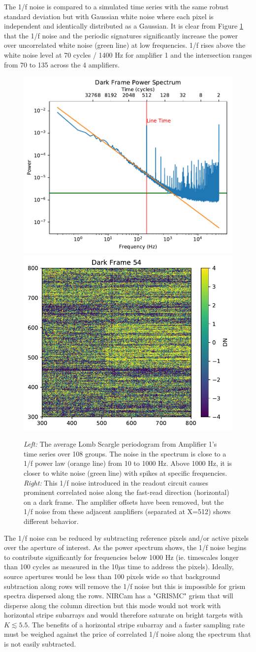 \documentclass{aastex62}
\begin{document}
The 1/f noise is compared to a simulated time series with the same robust standard deviation but with Gaussian white noise where each pixel is independent and identically distributed as a Gaussian.
It is clear from Figure \ref{fig:pixelTSeriesPSpec} that the 1/f noise and the periodic signatures significantly increase the power over uncorrelated white noise (green line) at low frequencies.
1/f rises above the white noise level at 70 cycles / 1400 Hz for amplifier 1 and the intersection ranges from 70 to 135 across the 4 amplifiers.

\begin{figure}[!hbtp]
\centering
\includegraphics[width=.4\columnwidth]{avg_psd_amp_1.pdf}
\includegraphics[width=.4\columnwidth]{preamp_removed_grp_54.pdf}
\caption{{\it Left:} The average Lomb Scargle periodogram from Amplifier 1's time series over 108 groups.
The noise in the spectrum is close to a 1/f power law (orange line) from 10 to 1000 Hz.
Above 1000 Hz, it is closer to white noise (green line) with spikes at specific frequencies.
{\it Right:} This 1/f noise introduced in the readout circuit causes prominent correlated noise along the fast-read direction (horizontal) on a dark frame.
The amplifier offsets have been removed, but the 1/f noise from these adjacent amplifiers (separated at X=512) shows different behavior.
}\label{fig:pixelTSeriesPSpec}
\end{figure}

The 1/f noise can be reduced by subtracting reference pixels and/or active pixels over the aperture of interest.
As the power spectrum shows, the 1/f noise begins to contribute significantly for frequencies below 1000 Hz (ie. timescales longer than 100 cycles as measured in the 10$\mu$s time to address the pixels).
Ideally, source apertures would be less than 100 pixels wide so that background subtraction along rows will remove the 1/f noise but this is impossible for grism spectra dispersed along the rows.
NIRCam has a "GRISMC" grism that will disperse along the column direction but this mode would not work with horizontal stripe subarrays and would therefore saturate on bright targets with $K \lesssim 5.5$.
The benefits of a horizontal stripe subarray and a faster sampling rate must be weighed against the price of correlated 1/f noise along the spectrum that is not easily subtracted.
\end{document}
